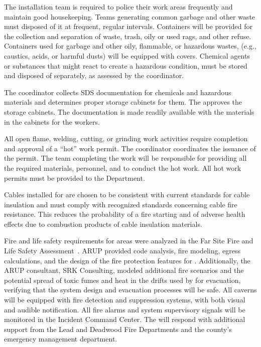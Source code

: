 The  installation team is required to police their work areas
frequently and maintain good housekeeping. Teams generating common garbage and other
waste must disposed of it at frequent, regular intervals. %
Containers will be provided for the
collection and separation of waste, trash, oily or used rags, and other
refuse.  Containers used for garbage and other oily, flammable, or
hazardous wastes, (e.g., caustics, acids, or harmful dusts) will be equipped with covers.  Chemical agents or
substances that might react to create a hazardous condition, must
be stored and disposed of separately, as assessed by the
  coordinator.

The   coordinator collects SDS documentation for chemicals and hazardous materials and determines proper storage cabinets for them. The  approves the storage cabinets. The documentation is made readily available with the materials in the cabinets for the workers. 



All open flame, welding, cutting, or grinding work activities require completion and approval of a  ``hot'' work permit.  The 
 coordinator coordinates the issuance of the permit.
The team completing the work will be responsible for
providing all the required materials, personnel, and  %
to conduct the hot work. All hot work permits must be
provided to the   Department.

Cables installed for  are chosen to be
consistent with current \fnal standards for cable insulation and must
comply with recognized standards concerning cable fire resistance. 
This reduces the probability of a fire starting and of adverse health effects due to
combustion products of cable insulation materials.

Fire and life safety requirements for  areas were
analyzed in the  Far Site Fire and Life Safety
  Assessment~. ARUP provided code analysis, fire
modeling, egress calculations, and the design of the fire protection
features for  .  Additionally, the ARUP
consultant, SRK Consulting, modeled additional fire scenarios and the potential
spread of toxic fumes and heat in the drifts used by
 for evacuation, verifying that the system design and evacuation 
    processes will be safe.   All caverns will be equipped with
fire detection and suppression systems, with both visual and audible
notification.  All fire alarms and system supervisory signals will be
monitored in the  Incident Command Center.  The
  will respond with additional support from the
Lead and Deadwood Fire Departments and the county’s emergency management
department.

